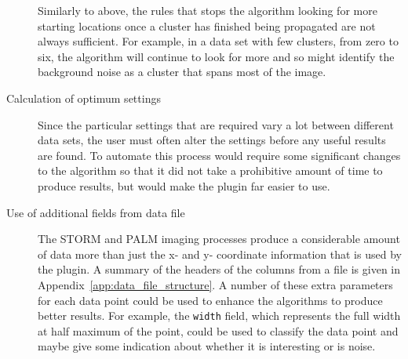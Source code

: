 \begin{description}
		Similarly to above, the rules that stops the algorithm looking for more
		starting locations once a cluster has finished being propagated are not
		always sufficient. For example, in a data set with few clusters, from
		zero to six, the algorithm will continue to look for more and so might
		identify the background noise as a cluster that spans most of the
		image.

	\item[Calculation of optimum settings] \hfill

		Since the particular settings that are required vary a lot between
		different data sets, the user must often alter the settings before any
		useful results are found. To automate this process would require some
		significant changes to the algorithm so that it did not take a
		prohibitive amount of time to produce results, but would make the
		plugin far easier to use.

	\item[Use of additional fields from data file] \hfill

		The STORM and PALM imaging processes produce a considerable amount of
		data more than just the x- and y- coordinate information that is used
		by the plugin. A summary of the headers of the columns from a file is
		given in Appendix~\ref{app:data_file_structure}. A number of these
		extra parameters for each data point could be used to enhance the
		algorithms to produce better results. For example, the \texttt{width}
		field, which represents the full width at half maximum of the point,
		could be used to classify the data point and maybe give some indication
		about whether it is interesting or is noise.

\end{description}
